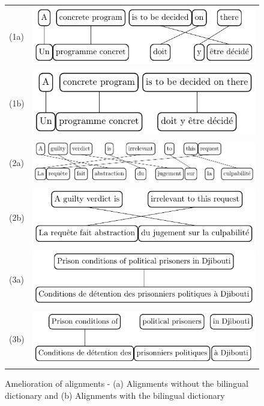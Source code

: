 \documentclass[output=paper,modfonts,nonflat]{langsci/langscibook}
\begin{document}
\begin{figure}
  \centering
  \begin{tabular}{l@{}C}
    (1a) & \includegraphics[scale=.85]{figures/figSemmar10}\\[1ex]
    (1b) & \includegraphics[scale=.85]{figures/figSemmar11}\\[2ex]
    (2a) & \includegraphics[scale=.85]{figures/figSemmar12}\\[1ex]
    (2b) & \includegraphics[scale=.85]{figures/figSemmar13}\\[2ex]
    (3a) & \includegraphics[scale=.85]{figures/figSemmar14}\\[1ex]
    (3b) & \includegraphics[scale=.85]{figures/figSemmar15}\\
  \end{tabular}
  \caption{\label{sem:fig:improvali}Amelioration of alignments - (a) Alignments without the bilingual dictionary and (b) Alignments with the bilingual dictionary}
\end{figure}
\end{document}
